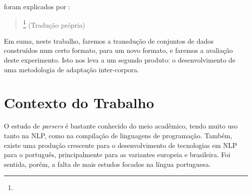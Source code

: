 
 foram explicados por :
\begin{quote}
    \footnote{}
    (Tradução própria)
\end{quote}

Em suma, neste trabalho, faremos a transdução de conjuntos de dados construídos num certo formato, para um novo formato, e faremos a avaliação deste experimento. Isto nos leva a um segundo produto: o desenvolvimento de uma metodologia de adaptação inter-corpora.


    
\section{Contexto do Trabalho}
\label{sec:contexto}

O estudo de \textit{parsers} é bastante conhecido do meio acadêmico, tendo muito uso tanto na NLP, como na compilação de linguagens de programação. Também, existe uma produção crescente para o desenvolvimento de tecnologias em NLP para o português, principalmente para as variantes europeia e brasileira. 
Foi sentida, porém, a falta de mais estudos focados na língua portuguesa.

